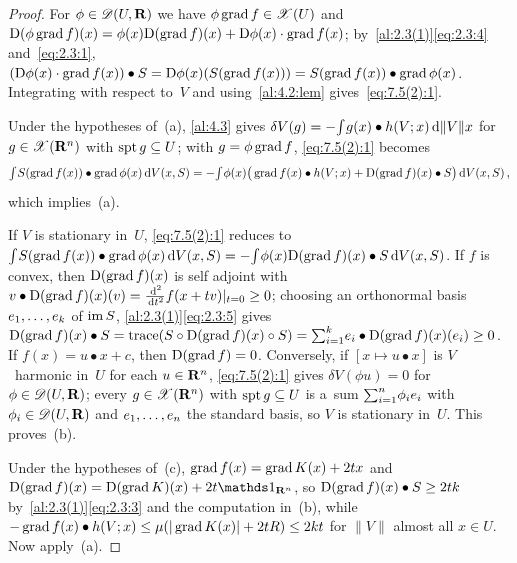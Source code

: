 \begin{proof}
    For $\phi \in \mathscr{D}(U,\mathbf{R})$ we have $\phi \operatorname{grad} f \in \mathscr{X}(U)$ and $\mathrm{D}(\phi \operatorname{grad} f)(x) =
    \phi(x) \mathrm{D}(\operatorname{grad} f)(x) + \mathrm{D} \phi(x) \cdot \operatorname{grad} f(x)$; by~\ref{al:2.3(1)}\eqref{eq:2.3:4}
    and~\eqref{eq:2.3:1}, $(\mathrm{D} \phi(x) \cdot \operatorname{grad} f(x)) \bullet S = \mathrm{D} \phi(x)(S(\operatorname{grad} f(x))) =
    S(\operatorname{grad} f(x)) \bullet \operatorname{grad} \phi(x)$. Integrating with respect to~$V$ and
    using~\ref{al:4.2:lem} gives~\eqref{eq:7.5(2):1}.

    Under the hypotheses of~(a), \ref{al:4.3} gives $\delta V(g) = - {\textstyle\int_{}^{}} g(x) \bullet
    h(V;x) \,\mathrm{d} \|V\| x$ for $g \in \mathscr{X}(\mathbf{R}^{n})$ with $\operatorname{spt} g \subseteq U$; with $g = \phi
    \operatorname{grad} f$, \eqref{eq:7.5(2):1} becomes
    \begin{displaymath}
        {\textstyle\int_{}^{}} S(\operatorname{grad} f(x)) \bullet \operatorname{grad} \phi(x) \,\mathrm{d} V(x,S) = - {\textstyle\int_{}^{}} \phi(x) \big(
        \operatorname{grad} f(x) \bullet h(V;x) + \mathrm{D}(\operatorname{grad} f)(x) \bullet S \big) \,\mathrm{d} V(x,S) \,,
    \end{displaymath}
    which implies~(a).

    If $V$ is stationary in~$U$, \eqref{eq:7.5(2):1} reduces to ${\textstyle\int_{}^{}} S(\operatorname{grad} f(x)) \bullet
    \operatorname{grad} \phi(x) \,\mathrm{d} V(x,S) = - {\textstyle\int_{}^{}} \phi(x) \mathrm{D}(\operatorname{grad} f)(x) \bullet S \,\mathrm{d} V(x,S)$. If $f$
    is convex, then $\mathrm{D}(\operatorname{grad} f)(x)$ is self adjoint with $v \bullet \mathrm{D}(\operatorname{grad} f)(x)(v) =
    \frac{\,\mathrm{d}^2}{\,\mathrm{d} t^2} f(x + t v)|_{t=0} \ge 0$; choosing an orthonormal basis $e_1, \ldots,
    e_{k}$ of $\operatorname{im} S$, \ref{al:2.3(1)}\eqref{eq:2.3:5} gives $\mathrm{D}(\operatorname{grad} f)(x) \bullet S =
    \operatorname{trace}(S \circ \mathrm{D}(\operatorname{grad} f)(x) \circ S) = {\textstyle\sum_{i=1}^{k}} e_i \bullet \mathrm{D}(\operatorname{grad} f)(x)(e_i)
    \ge 0$. If $f(x) = u \bullet x + c$, then $\mathrm{D}(\operatorname{grad} f) = 0$. Conversely, if $[x \mapsto u
    \bullet x]$ is $V$~harmonic in~$U$ for each $u \in \mathbf{R}^{n}$, \eqref{eq:7.5(2):1} gives
    $\delta V(\phi u) = 0$ for $\phi \in \mathscr{D}(U,\mathbf{R})$; every $g \in \mathscr{X}(\mathbf{R}^{n})$ with $\operatorname{spt} g
    \subseteq U$ is a~sum ${\textstyle\sum_{i=1}^{n}} \phi_i e_i$ with $\phi_i \in \mathscr{D}(U,\mathbf{R})$ and
    $e_1, \ldots, e_{n}$ the standard basis, so $V$ is stationary in~$U$. This proves~(b).

    Under the hypotheses of~(c), $\operatorname{grad} f(x) = \operatorname{grad} K(x) + 2 t x$ and $\uD(\grad f)(x) = \uD(\grad
    K)(x) + 2 t \id{\R^{\adim}}$, so $\mathrm{D}(\operatorname{grad} f)(x) \bullet S \ge 2 t k$
    by~\ref{al:2.3(1)}\eqref{eq:2.3:3} and the computation in~(b), while $- \operatorname{grad} f(x) \bullet
    h(V;x) \le \mu (|\operatorname{grad} K(x)| + 2 t R) \le 2 k t$ for $\|V\|$ almost all $x \in U$. Now
    apply~(a).
\end{proof}

